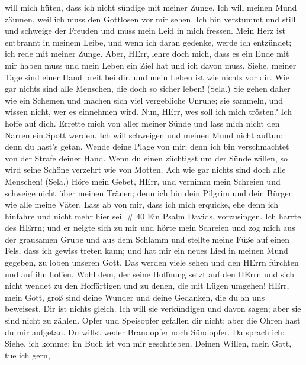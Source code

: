 will mich hüten, dass ich nicht sündige mit meiner Zunge. Ich will
meinen Mund zäumen, weil ich muss den Gottlosen vor mir sehen.
 Ich bin verstummt und still und schweige der Freuden und
muss mein Leid in mich fressen.  Mein Herz ist entbrannt in
meinem Leibe, und wenn ich daran gedenke, werde ich entzündet; ich rede
mit meiner Zunge.  Aber, HErr, lehre doch mich, dass es ein
Ende mit mir haben muss und mein Leben ein Ziel hat und ich davon muss.
 Siehe, meiner Tage sind einer Hand breit bei dir, und mein
Leben ist wie nichts vor dir. Wie gar nichts sind alle Menschen, die
doch so sicher leben! (Sela.)  Sie gehen daher wie ein
Schemen und machen sich viel vergebliche Unruhe; sie sammeln, und wissen
nicht, wer es einnehmen wird.  Nun, HErr, wes soll ich mich
trösten? Ich hoffe auf dich.  Errette mich von aller meiner
Sünde und lass mich nicht den Narren ein Spott werden.  Ich
will schweigen und meinen Mund nicht auftun; denn du hast's getan.
 Wende deine Plage von mir; denn ich bin verschmachtet von
der Strafe deiner Hand.  Wenn du einen züchtigst um der
Sünde willen, so wird seine Schöne verzehrt wie von Motten. Ach wie gar
nichts sind doch alle Menschen! (Sela.)  Höre mein Gebet,
HErr, und vernimm mein Schreien und schweige nicht über meinen Tränen;
denn ich bin dein Pilgrim und dein Bürger wie alle meine Väter.
 Lass ab von mir, dass ich mich erquicke, ehe denn ich
hinfahre und nicht mehr hier sei. \# 40  Ein Psalm Davids,
vorzusingen.  Ich harrte des HErrn; und er neigte sich zu
mir und hörte mein Schreien  und zog mich aus der grausamen
Grube und aus dem Schlamm und stellte meine Füße auf einen Fels, dass
ich gewiss treten kann;  und hat mir ein neues Lied in
meinen Mund gegeben, zu loben unseren Gott. Das werden viele sehen und
den HErrn fürchten und auf ihn hoffen.  Wohl dem, der seine
Hoffnung setzt auf den HErrn und sich nicht wendet zu den Hoffärtigen
und zu denen, die mit Lügen umgehen!  HErr, mein Gott, groß
sind deine Wunder und deine Gedanken, die du an uns beweisest. Dir ist
nichts gleich. Ich will sie verkündigen und davon sagen; aber sie sind
nicht zu zählen.  Opfer und Speisopfer gefallen dir nicht;
aber die Ohren hast du mir aufgetan. Du willst weder Brandopfer noch
Sündopfer.  Da sprach ich: Siehe, ich komme; im Buch ist von
mir geschrieben.  Deinen Willen, mein Gott, tue ich gern,
